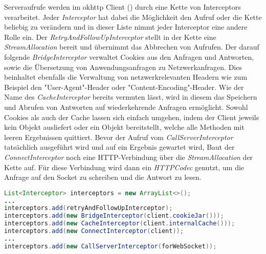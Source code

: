         Serveraufrufe werden im okhttp Client () durch eine Kette von Interceptors verarbeitet. Jeder {\it Interceptor} hat dabei die Möglichkeit den Aufruf oder die Kette beliebig zu verändern und in dieser Liste nimmt jeder Interceptor eine andere Rolle ein. Der {\it RetryAndFollowUpInterceptor} stellt in der Kette eine {\it StreamAllocation} bereit und übernimmt das Abbrechen von Aufrufen. Der darauf folgende {\it BridgeInterceptor} verwaltet Cookies aus den Anfragen und Antworten, sowie die Übersetzung von Anwendungsanfragen zu Netzwerkanfragen. Dies beinhaltet ebenfalls die Verwaltung von netzwerkrelevanten Headern wie zum Beispiel den "User-Agent"-Header oder "Content-Encoding"-Header. Wie der Name des {\it CacheInterceptor} bereits vermuten lässt, wird in diesem das Speichern und Abrufen von Antworten auf wiederkehrende Anfragen ermöglicht. Sowohl Cookies als auch der Cache lassen sich einfach umgehen, indem der Client jeweils kein Objekt ausliefert oder ein Objekt bereitstellt, welche alle Methoden mit leeren Ergebnissen quittiert. Bevor der Aufruf vom {\it CallServerInterceptor} tatsächlich ausgeführt wird und auf ein Ergebnis gewartet wird, Baut der {\it ConnectInterceptor} noch eine HTTP-Verbindung über die {\it StreamAllocation} der Kette auf. Für diese Verbindung wird dann ein {\it HTTPCodec} genutzt, um die Anfrage auf den Socket zu schreiben und die Antwort zu lesen.
        
        \pagebreak
        \begin{lstlisting}[frame=bt, label={lst:android:okhttp}, language=Java, caption=Interner Aufbau von okhttp (Clientcode in Java) \cite{okhttpRealCall}]
List<Interceptor> interceptors = new ArrayList<>();
...
interceptors.add(retryAndFollowUpInterceptor);
interceptors.add(new BridgeInterceptor(client.cookieJar()));
interceptors.add(new CacheInterceptor(client.internalCache()));
interceptors.add(new ConnectInterceptor(client));
...
interceptors.add(new CallServerInterceptor(forWebSocket));
        \end{lstlisting}        
        
